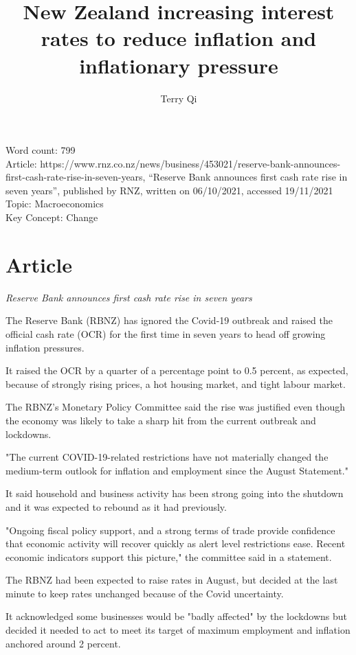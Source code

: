 \documentclass[a4paper,12pt]{article}
\title{New Zealand increasing interest rates to reduce inflation and inflationary pressure}
\author{Terry Qi}
\begin{document}
\maketitle

Word count: 799\\
Article: https://www.rnz.co.nz/news/business/453021/reserve-bank-announces-first-cash-rate-rise-in-seven-years, ``Reserve Bank announces first cash rate rise in seven years'', published by RNZ, written on 06/10/2021, accessed 19/11/2021\\
Topic: Macroeconomics\\
Key Concept: Change

\newpage

\section*{Article}

\textit{Reserve Bank announces first cash rate rise in seven years}

The Reserve Bank (RBNZ) has ignored the Covid-19 outbreak and raised the official cash rate (OCR) for the first time in seven years to head off growing inflation pressures.

It raised the OCR by a quarter of a percentage point to 0.5 percent, as expected, because of strongly rising prices, a hot housing market, and tight labour market.

The RBNZ's Monetary Policy Committee said the rise was justified even though the economy was likely to take a sharp hit from the current outbreak and lockdowns.

"The current COVID-19-related restrictions have not materially changed the medium-term outlook for inflation and employment since the August Statement."

It said household and business activity has been strong going into the shutdown and it was expected to rebound as it had previously.

"Ongoing fiscal policy support, and a strong terms of trade provide confidence that economic activity will recover quickly as alert level restrictions ease. Recent economic indicators support this picture," the committee said in a statement.

The RBNZ had been expected to raise rates in August, but decided at the last minute to keep rates unchanged because of the Covid uncertainty.

It acknowledged some businesses would be "badly affected" by the lockdowns but decided it needed to act to meet its target of maximum employment and inflation anchored around 2 percent.
\end{document}
